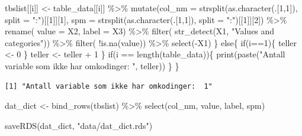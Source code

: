 \documentclass[
  letterpaper,
  DIV=11,
  numbers=noendperiod]{scrreprt}
\newenvironment{Shaded}{\begin{snugshade}}{\end{snugshade}}
\newcommand{\AttributeTok}[1]{\textcolor[rgb]{0.40,0.45,0.13}{#1}}
\newcommand{\ControlFlowTok}[1]{\textcolor[rgb]{0.00,0.23,0.31}{#1}}
\newcommand{\DecValTok}[1]{\textcolor[rgb]{0.68,0.00,0.00}{#1}}
\newcommand{\FunctionTok}[1]{\textcolor[rgb]{0.28,0.35,0.67}{#1}}
\newcommand{\NormalTok}[1]{\textcolor[rgb]{0.00,0.23,0.31}{#1}}
\newcommand{\OtherTok}[1]{\textcolor[rgb]{0.00,0.23,0.31}{#1}}
\newcommand{\SpecialCharTok}[1]{\textcolor[rgb]{0.37,0.37,0.37}{#1}}
\newcommand{\StringTok}[1]{\textcolor[rgb]{0.13,0.47,0.30}{#1}}
\theoremstyle{definition}
\theoremstyle{remark}
\begin{document}
\begin{Shaded}
\begin{Highlighting}[]
\NormalTok{    tbslist[[i]] }\OtherTok{\textless{}{-}}\NormalTok{ table\_data[[i]] }\SpecialCharTok{\%\textgreater{}\%} 
      \FunctionTok{mutate}\NormalTok{(}\AttributeTok{col\_nm =} \FunctionTok{strsplit}\NormalTok{(}\FunctionTok{as.character}\NormalTok{(.[}\DecValTok{1}\NormalTok{,}\DecValTok{1}\NormalTok{]), }\AttributeTok{split =} \StringTok{":"}\NormalTok{)[[}\DecValTok{1}\NormalTok{]][}\DecValTok{1}\NormalTok{],}
             \AttributeTok{spm =} \FunctionTok{strsplit}\NormalTok{(}\FunctionTok{as.character}\NormalTok{(.[}\DecValTok{1}\NormalTok{,}\DecValTok{1}\NormalTok{]), }\AttributeTok{split =} \StringTok{":"}\NormalTok{)[[}\DecValTok{1}\NormalTok{]][}\DecValTok{2}\NormalTok{]) }\SpecialCharTok{\%\textgreater{}\%} 
      \FunctionTok{rename}\NormalTok{( }\AttributeTok{value =}\NormalTok{ X2, }
              \AttributeTok{label =}\NormalTok{ X3) }\SpecialCharTok{\%\textgreater{}\%}
      \FunctionTok{filter}\NormalTok{( }\FunctionTok{str\_detect}\NormalTok{(X1, }\StringTok{"Values and categories"}\NormalTok{)) }\SpecialCharTok{\%\textgreater{}\%} 
      \FunctionTok{filter}\NormalTok{( }\SpecialCharTok{!}\FunctionTok{is.na}\NormalTok{(value)) }\SpecialCharTok{\%\textgreater{}\%} 
      \FunctionTok{select}\NormalTok{(}\SpecialCharTok{{-}}\NormalTok{X1)}
\NormalTok{  \}}
  \ControlFlowTok{else}\NormalTok{\{}
    \ControlFlowTok{if}\NormalTok{(i}\SpecialCharTok{==}\DecValTok{1}\NormalTok{)\{}
\NormalTok{      teller }\OtherTok{\textless{}{-}} \DecValTok{0}
\NormalTok{      \}}
\NormalTok{    teller }\OtherTok{\textless{}{-}}\NormalTok{ teller }\SpecialCharTok{+} \DecValTok{1} 
\NormalTok{  \}}
  \ControlFlowTok{if}\NormalTok{(i }\SpecialCharTok{==} \FunctionTok{length}\NormalTok{(table\_data))\{}
    \FunctionTok{print}\NormalTok{(}\FunctionTok{paste}\NormalTok{(}\StringTok{"Antall variable som ikke har omkodinger: "}\NormalTok{, teller)) }
\NormalTok{  \}}
\NormalTok{\}}
\end{Highlighting}
\end{Shaded}

\begin{verbatim}
[1] "Antall variable som ikke har omkodinger:  1"
\end{verbatim}

\begin{Shaded}
\begin{Highlighting}[]
\NormalTok{dat\_dict }\OtherTok{\textless{}{-}} \FunctionTok{bind\_rows}\NormalTok{(tbslist) }\SpecialCharTok{\%\textgreater{}\%} 
  \FunctionTok{select}\NormalTok{(col\_nm, value, label, spm)}
\end{Highlighting}
\end{Shaded}

\begin{Shaded}
\begin{Highlighting}[]
\FunctionTok{saveRDS}\NormalTok{(dat\_dict, }\StringTok{"data/dat\_dict.rds"}\NormalTok{)}
\end{Highlighting}
\end{Shaded}
\end{document}
